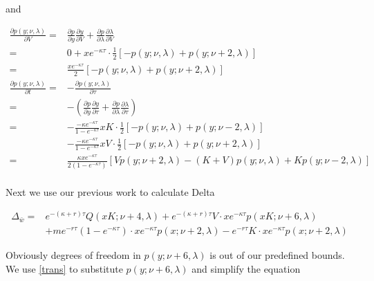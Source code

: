 and

\begin{equation}\label{pdf diff2}
    \begin{aligned}
        \frac{\partial p(y;\nu,\lambda)}{\partial V} =& \frac{\partial p}{\partial y}\frac{\partial y}{\partial V} + \frac{\partial p}{\partial \lambda} \frac{\partial \lambda}{\partial V} \\
        =& 0+ x e^{-\kappa \tau} \cdot \frac{1}{2} [-p(y; \nu, \lambda)+p(y ; \nu+2, \lambda)]\\
        =& \frac{x e^{-\kappa \tau}}{2} [-p(y ; \nu, \lambda)+p(y ; \nu+2, \lambda)] \\
        \frac{\partial p(y; \nu, \lambda)}{\partial t}=& -\frac{\partial p(y; \nu, \lambda)}{\partial \tau}\\
        =&-\left(\frac{\partial p}{\partial y}\frac{\partial y}{\partial \tau} + \frac{\partial p}{\partial \lambda} \frac{\partial \lambda}{\partial \tau}\right) \\
        =& -\frac{-\kappa e^{-\kappa \tau}}{1 - e^{-\kappa \tau}}xK \cdot  \frac{1}{2}[-p(y ; \nu, \lambda)+p(y ; \nu-2, \lambda)]\\
         &-\frac{-\kappa e^{-\kappa \tau}}{1 - e^{-\kappa \tau}}xV \cdot \frac{1}{2}[-p(y ; \nu, \lambda)+p(y ; \nu+2, \lambda)]\\
        =& \frac{\kappa x e^{-\kappa \tau}}{2(1 - e^{-\kappa \tau})} \left[Vp(y ; \nu+2, \lambda) - (K+V) p(y; \nu, \lambda) + K p(y; \nu-2, \lambda)\right]\\
    \end{aligned}
\end{equation}

Next we use our previous work to calculate Delta

\begin{equation}
    \begin{aligned}
        \Delta_{\bar{w}}=&  e^{ -(\kappa+r) \tau} Q(x K ; \nu+4, \lambda) + e^{ -(\kappa+r) \tau}V \cdot x e^{-\kappa \tau} p(x K ; \nu+6, \lambda)\\
        &+ m e^{-r \tau}(1-e^{-\kappa \tau}) \cdot x e^{-\kappa \tau} p(x ; \nu+2, \lambda) -e^{-r \tau} K \cdot x e^{-\kappa \tau} p(x ; \nu+2, \lambda)
        \end{aligned}
\end{equation}

\noindent Obviously degrees of freedom in $p(y;\nu+6,\lambda)$ is out of our predefined bounds. We use \eqref{trans} to substitute $p(y;\nu+6,\lambda)$ and simplify the equation

